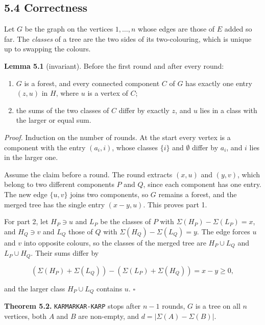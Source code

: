 \documentclass[
]{article}
\providecommand{\tightlist}{%
  \setlength{\itemsep}{0pt}\setlength{\parskip}{0pt}}
\begin{document}
\hypertarget{correctness-3}{%
\subsection{5.4 Correctness}\label{correctness-3}}

Let \(G\) be the graph on the vertices \(1, \dots, n\) whose edges are
those of \(E\) added so far. The \emph{classes} of a tree are the two
sides of its two-colouring, which is unique up to swapping the colours.

\textbf{Lemma 5.1} (invariant). Before the first round and after every
round:

\begin{enumerate}
\def\labelenumi{\arabic{enumi}.}
\tightlist
\item
  \(G\) is a forest, and every connected component \(C\) of \(G\) has
  exactly one entry \((z, u)\) in \(H\), where \(u\) is a vertex of
  \(C\);
\item
  the sums of the two classes of \(C\) differ by exactly \(z\), and
  \(u\) lies in a class with the larger or equal sum.
\end{enumerate}

\emph{Proof.} Induction on the number of rounds. At the start every
vertex is a component with the entry \((a_i, i)\), whose classes
\(\lbrace i \rbrace\) and \(\emptyset\) differ by \(a_i\), and \(i\)
lies in the larger one.

Assume the claim before a round. The round extracts \((x, u)\) and
\((y, v)\), which belong to two different components \(P\) and \(Q\),
since each component has one entry. The new edge
\(\lbrace u, v \rbrace\) joins two components, so \(G\) remains a
forest, and the merged tree has the single entry \((x - y, u)\). This
proves part 1.

For part 2, let \(H_P \ni u\) and \(L_P\) be the classes of \(P\) with
\(\Sigma(H_P) - \Sigma(L_P) = x\), and \(H_Q \ni v\) and \(L_Q\) those
of \(Q\) with \(\Sigma(H_Q) - \Sigma(L_Q) = y\). The edge forces \(u\)
and \(v\) into opposite colours, so the classes of the merged tree are
\(H_P \cup L_Q\) and \(L_P \cup H_Q\). Their sums differ by

\[
(\Sigma(H_P) + \Sigma(L_Q)) - (\Sigma(L_P) + \Sigma(H_Q)) = x - y \ge 0 ,
\]

and the larger class \(H_P \cup L_Q\) contains \(u\). \(\square\)

\textbf{Theorem 5.2.} \texttt{KARMARKAR-KARP} stops after \(n - 1\)
rounds, \(G\) is a tree on all \(n\) vertices, both \(A\) and \(B\) are
non-empty, and \(d = |\Sigma(A) - \Sigma(B)|\).
\end{document}
